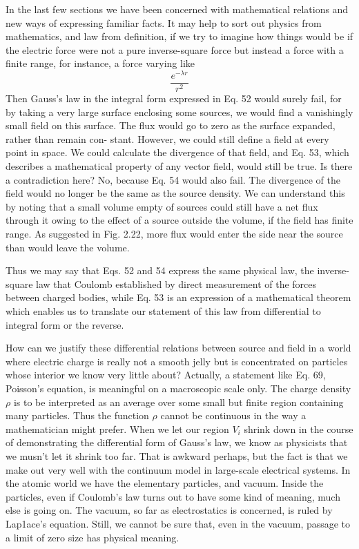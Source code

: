 In the last few sections we have been concerned with mathematical
relations and new ways of expressing familiar facts. It may help to
sort out physics from mathematics, and law from definition, if we
try to imagine how things would be if the electric force were not a
pure inverse-square force but instead a force with a finite range, for
instance, a force varying like
\begin{equation}
  \frac{e^{-\lambda r}}{r^2}
\end{equation}
Then Gauss's law in the integral form expressed in Eq. 52 would
surely fail, for by taking a very large surface enclosing some sources,
we would find a vanishingly small field on this surface. The flux
would go to zero as the surface expanded, rather than remain con-
stant. However, we could still define a field at every point in space.
We could calculate the divergence of that field, and Eq. 53, which
describes a mathematical property of any vector field, would still be
true. Is there a contradiction here? No, because Eq. 54 would also
fail. The divergence of the field would no longer be the same as the
source density. We can understand this by noting that a small
volume empty of sources could still have a net flux through it owing
to the effect of a source outside the volume, if the field has finite range.
As suggested in Fig. 2.22, more flux would enter the side near the
source than would leave the volume.

Thus we may say that Eqs. 52 and 54 express the same physical
law, the inverse-square law that Coulomb established by direct
measurement of the forces between charged bodies, while Eq. 53 is
an expression of a mathematical theorem which enables us to translate
our statement of this law from differential to integral form or
the reverse.

How can we justify these differential relations between source and
field in a world where electric charge is really not a smooth jelly but
is concentrated on particles whose interior we know very little about?
Actually, a statement like Eq. 69, Poisson's equation, is meaningful
on a macroscopic scale only. The charge density $\rho$ is to be interpreted
as an average over some small but finite region containing
many particles. Thus the function $\rho$ cannot be continuous in the
way a mathematician might prefer. When we let our region $V_i$ shrink
down in the course of demonstrating the differential form of Gauss's
law, we know as physicists that we musn't let it shrink too far. That
is awkward perhaps, but the fact is that we make out very well with
the continuum model in large-scale electrical systems. In the atomic
world we have the elementary particles, and vacuum. Inside the
particles, even if Coulomb's law turns out to have some kind of meaning,
much else is going on. The vacuum, so far as electrostatics is
concerned, is ruled by Lap1ace's equation. Still, we cannot be sure
that, even in the vacuum, passage to a limit of zero size has physical
meaning.

